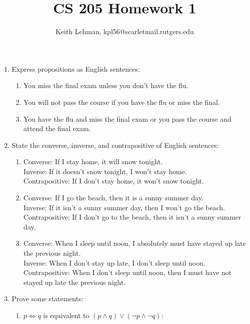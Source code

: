 \documentclass{article}
\title{CS 205 Homework 1}
\author{Keith Lehman, kpl56@scarletmail.rutgers.edu}
\begin{document}
\maketitle

\begin{enumerate}
    \item Express propositions as English sentences:
    \begin{enumerate}
        \item You miss the final exam unless you don't have the flu.
        \item You will not pass the course if you have the flu or miss the final.
        \item You have the flu and miss the final exam or you pass the course and attend the final exam.
    \end{enumerate}
    \item State the converse, imverse, and contrapositive of English sentences:
    \begin{enumerate}
        \item
            Converse: If I stay home, it will snow tonight. \\
            Inverse: If it doesn't snow tonight, I won't stay home. \\
            Contrapositive: If I don't stay home, it won't snow tonight. \\
        \item
            Converse: If I go the beach, then it is a sunny summer day. \\
            Inverse: If it isn't a sunny summer day, then I won't go the beach. \\
            Contrapositive: If I don't go to the beach, then it isn't a sunny summer day. \\
        \item
            Converse: When I sleep until noon, I absolutely must have stayed up late the previous night. \\
            Inverse: When I don't stay up late, I don't sleep until noon. \\
            Contrapositive: When I don't sleep until noon, then I must have not stayed up late the previous night. \\
    \end{enumerate}
    \item Prove some statements:
    \begin{enumerate}
        \item $p \iff q$ is equivalent to $(p \land q) \lor (\lnot p \land \lnot q)$: \\  

\end{enumerate}
\end{enumerate}
\end{document}
